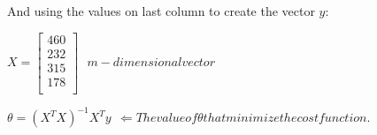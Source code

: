 \documentclass[a4paper]{report}
\begin{document}
          And using the values on last column to create the vector $y$:

          $X =
          \begin{bmatrix}
            460 \\
            232 \\
            315 \\
            178 \\
          \end{bmatrix} \ \ \ m-dimensional vector$

          \textbf{$\theta = (X^{T}X)^{-1}X^{T}y \ \ \Leftarrow The value of \theta that minimize the cost function.$}
\end{document}
